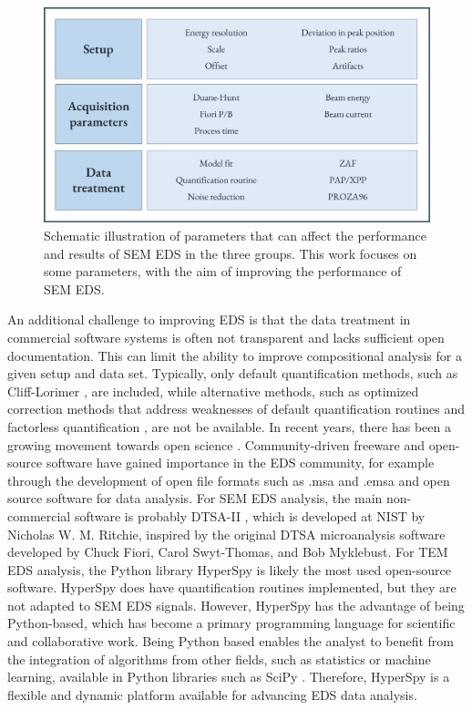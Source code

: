 \begin{figure}[!ht]
  \centering
  \includegraphics[width=0.8\linewidth]{figures/intro_parameters.png}
  \caption{
    Schematic illustration of parameters that can affect the performance and results of SEM EDS in the three groups.
    This work focuses on some parameters, with the aim of improving the performance of SEM EDS.
  }
  \label{fig:intro:parameters}
\end{figure}





An additional challenge to improving EDS is that the data treatment in commercial software systems is often not transparent and lacks sufficient open documentation.
This can limit the ability to improve compositional analysis for a given setup and data set.
Typically, only default quantification methods, such as Cliff-Lorimer \cite{CL1975}, are included, while alternative methods, such as optimized correction methods that address weaknesses of default quantification routines and factorless quantification \cite{nilsen_factorless_2021}, are not be available.
In recent years, there has been a growing movement towards open science \cite{opensource_2013}. %
Community-driven freeware and open-source software have gained importance in the EDS community, for example through the development of open file formats such as .msa and .emsa \cite{iso_emsa_22029} and open source software for data analysis.
For SEM EDS analysis, the main non-commercial software is probably DTSA-II \cite{dtsaii_1_getting_started}, which is developed at NIST by Nicholas W. M. Ritchie, inspired by the original DTSA microanalysis software developed by Chuck Fiori, Carol Swyt-Thomas, and Bob Myklebust.
For TEM EDS analysis, the Python library HyperSpy \cite{hyperspy_1.7.1} is likely the most used open-source software. %
HyperSpy does have quantification routines implemented, but they are not adapted to SEM EDS signals.
However, HyperSpy has the advantage of being Python-based, which has become a primary programming language for scientific and collaborative work.
Being Python based enables the analyst to benefit from the integration of algorithms from other fields, such as statistics or machine learning, available in Python libraries such as SciPy \cite{2020SciPy}.
Therefore, HyperSpy is a flexible and dynamic platform available for advancing EDS data analysis.





